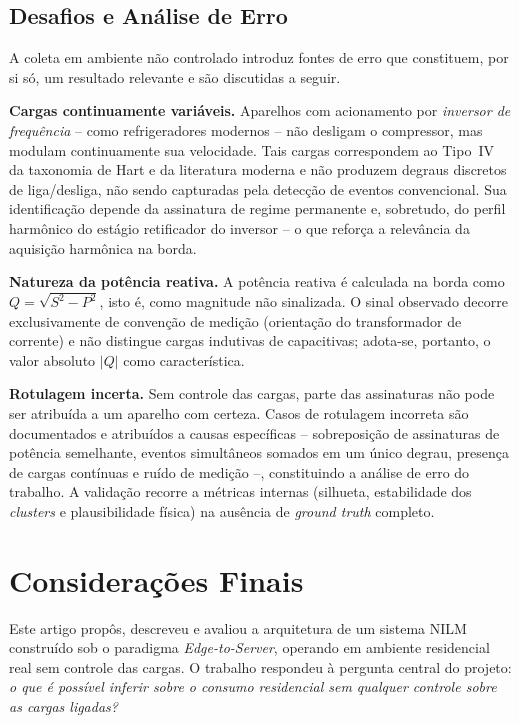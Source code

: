\documentclass[12pt]{article}
\begin{document}
\subsection{Desafios e An\'alise de Erro}

A coleta em ambiente n\~ao controlado introduz fontes de erro que constituem, por
si s\'o, um resultado relevante e s\~ao discutidas a seguir.

\textbf{Cargas continuamente vari\'aveis.} Aparelhos com acionamento por
\textit{inversor de frequ\^encia} -- como refrigeradores modernos -- n\~ao
desligam o compressor, mas modulam continuamente sua velocidade. Tais cargas
correspondem ao Tipo~IV da taxonomia de Hart e da literatura moderna \citep{ref1,ref7} e n\~ao
produzem degraus discretos de liga/desliga, n\~ao sendo capturadas pela detec\c{c}\~ao
de eventos convencional. Sua identifica\c{c}\~ao depende da assinatura de regime
permanente e, sobretudo, do perfil harm\^onico do est\'agio retificador do
inversor -- o que refor\c{c}a a relev\^ancia da aquisi\c{c}\~ao harm\^onica na
borda.

\textbf{Natureza da pot\^encia reativa.} A pot\^encia reativa \'e calculada na
borda como $Q = \sqrt{S^2 - P^2}$, isto \'e, como magnitude n\~ao sinalizada. O
sinal observado decorre exclusivamente de conven\c{c}\~ao de medi\c{c}\~ao
(orienta\c{c}\~ao do transformador de corrente) e n\~ao distingue cargas
indutivas de capacitivas; adota-se, portanto, o valor absoluto $|Q|$ como
caracter\'istica.

\textbf{Rotulagem incerta.} Sem controle das cargas, parte das assinaturas n\~ao
pode ser atribu\'ida a um aparelho com certeza. Casos de rotulagem incorreta s\~ao
documentados e atribu\'idos a causas espec\'ificas -- sobreposi\c{c}\~ao de
assinaturas de pot\^encia semelhante, eventos simult\^aneos somados em um \'unico
degrau, presen\c{c}a de cargas cont\'inuas e ru\'ido de medi\c{c}\~ao --,
constituindo a an\'alise de erro do trabalho. A valida\c{c}\~ao recorre a
m\'etricas internas (silhueta, estabilidade dos \textit{clusters} e
plausibilidade f\'isica) na aus\^encia de \textit{ground truth} completo.


\section{Considera\c{c}\~oes Finais}

Este artigo propôs, descreveu e avaliou a arquitetura de um sistema NILM
constru\'ido sob o paradigma \textit{Edge-to-Server}, operando em ambiente
residencial real sem controle das cargas. O trabalho respondeu \`a pergunta
central do projeto: \textit{o que \'e poss\'ivel inferir sobre o consumo
residencial sem qualquer controle sobre as cargas ligadas?}
\end{document}
